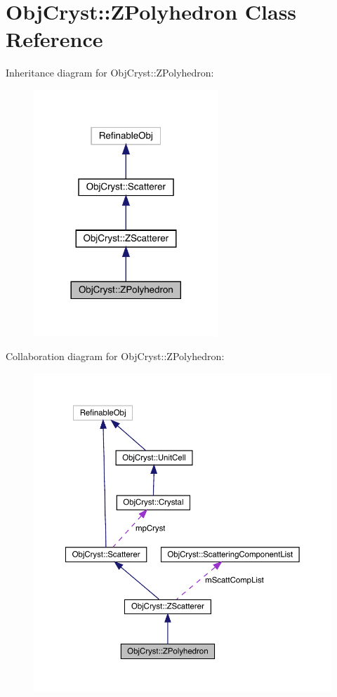 \hypertarget{class_obj_cryst_1_1_z_polyhedron}{}\section{Obj\+Cryst\+::Z\+Polyhedron Class Reference}
\label{class_obj_cryst_1_1_z_polyhedron}


Inheritance diagram for Obj\+Cryst\+::Z\+Polyhedron\+:
\nopagebreak
\begin{figure}[H]
\begin{center}
\leavevmode
\includegraphics[width=197pt]{class_obj_cryst_1_1_z_polyhedron__inherit__graph}
\end{center}
\end{figure}


Collaboration diagram for Obj\+Cryst\+::Z\+Polyhedron\+:
\nopagebreak
\begin{figure}[H]
\begin{center}
\leavevmode
\includegraphics[width=350pt]{class_obj_cryst_1_1_z_polyhedron__coll__graph}
\end{center}
\end{figure}
